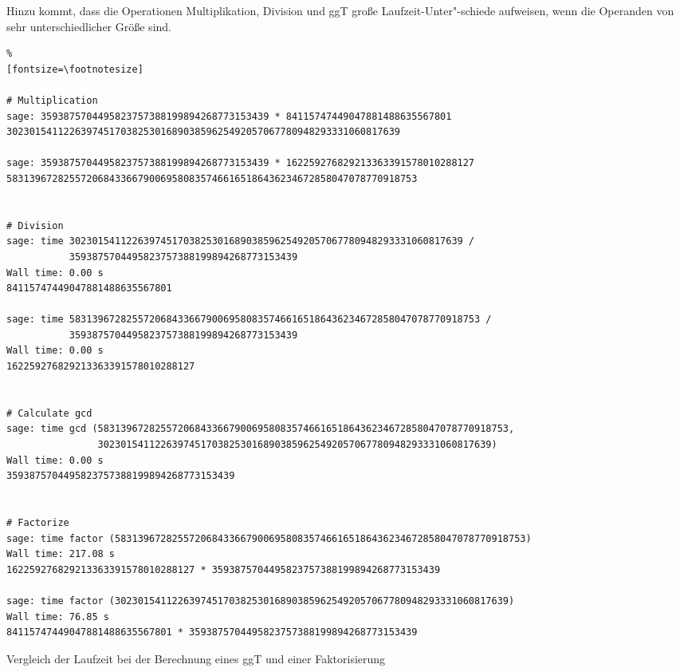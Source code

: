 \begin{refsegment}
Hinzu kommt, dass die Operationen Multiplikation, Division und ggT große Laufzeit-Unter"-schiede aufweisen, wenn die Operanden von sehr unterschiedlicher Größe sind.

%
\begin{sagecode}
\begin{Verbatim}%
[fontsize=\footnotesize]

# Multiplication
sage: 3593875704495823757388199894268773153439 * 84115747449047881488635567801
302301541122639745170382530168903859625492057067780948293331060817639

sage: 3593875704495823757388199894268773153439 * 162259276829213363391578010288127
583139672825572068433667900695808357466165186436234672858047078770918753


# Division
sage: time 302301541122639745170382530168903859625492057067780948293331060817639 /
           3593875704495823757388199894268773153439
Wall time: 0.00 s
84115747449047881488635567801

sage: time 583139672825572068433667900695808357466165186436234672858047078770918753 /
           3593875704495823757388199894268773153439
Wall time: 0.00 s
162259276829213363391578010288127


# Calculate gcd
sage: time gcd (583139672825572068433667900695808357466165186436234672858047078770918753,
                302301541122639745170382530168903859625492057067780948293331060817639)
Wall time: 0.00 s
3593875704495823757388199894268773153439


# Factorize
sage: time factor (583139672825572068433667900695808357466165186436234672858047078770918753)
Wall time: 217.08 s
162259276829213363391578010288127 * 3593875704495823757388199894268773153439

sage: time factor (302301541122639745170382530168903859625492057067780948293331060817639)
Wall time: 76.85 s
84115747449047881488635567801 * 3593875704495823757388199894268773153439

\end{Verbatim}
\caption{Vergleich der Laufzeit bei der Berechnung eines ggT und einer Faktorisierung}
\label{nt_sagesample_Compare-Runtime-gcd-factoring}
\end{sagecode}




\end{refsegment}
